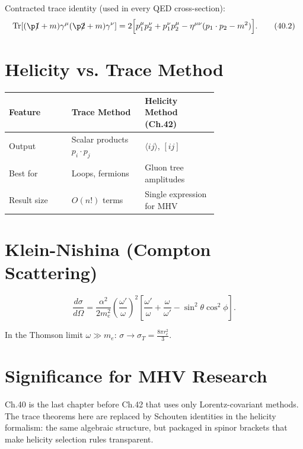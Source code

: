 \documentclass[12pt]{article}
\DeclareMathOperator\Tr{Tr}
\begin{document}
Contracted trace identity (used in every QED cross-section):
\begin{equation}
\Tr[(\p1\!\!\!/+m)\gamma^\mu(\p2\!\!\!/+m)\gamma^\nu]
= 2\Bigl[p_1^\mu p_2^\nu + p_1^\nu p_2^\mu
         -\eta^{\mu\nu}(p_1\cdot p_2-m^2)\Bigr] .
\tag{40.2}
\end{equation}

\section{Helicity vs. Trace Method}\label{sec:vs_helicity}
\begin{center}
\begin{tabular}{|l|p{0.35\linewidth}|p{0.35\linewidth}|}
\hline
Feature & Trace Method & Helicity Method (Ch.42) \\
\hline
Output & Scalar products $p_i\cdot p_j$ & $\langle ij\rangle$, $[ij]$ \\
Best for & Loops, fermions & Gluon tree amplitudes \\
Result size & $O(n!)$ terms & Single expression for MHV \\
\hline
\end{tabular}
\end{center}

\section{Klein-Nishina (Compton Scattering)}\label{sec:compton}
\begin{mdframed}[backgroundcolor=red!5]
\begin{equation}
\frac{d\sigma}{d\Omega}
= \frac{\alpha^2}{2m_e^2}
\left(\frac{\omega'}{\omega}\right)^2
\left[\frac{\omega'}{\omega}+\frac{\omega}{\omega'}
-\sin^2\theta\cos^2\phi\right] .
\tag{40.$\star\star$}
\end{equation}
\end{mdframed}
In the Thomson limit $\omega\gg m_e$: $\sigma\to\sigma_T=\frac{8\pi r_e^2}{3}$.

\section{Significance for MHV Research}
Ch.40 is the last chapter before Ch.42 that uses only Lorentz-covariant
methods.  The trace theorems here are replaced by Schouten identities in the
helicity formalism: the same algebraic structure, but packaged in spinor
brackets that make helicity selection rules transparent.
\end{document}
